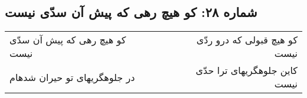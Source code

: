 \begin{center}
\section*{شماره ۲۸: کو هیچ رهی که پیش آن سدّی نیست}
\label{sec:028}
\begin{longtable}{l p{0.5cm} r}
کو هیچ رهی که پیش آن سدّی نیست
&&
کو هیچ قبولی که درو ردّی نیست
\\
در جلوهگریهای تو حیران شدهام
&&
کاین جلوهگریهای ترا حدّی نیست
\\
\end{longtable}
\end{center}
